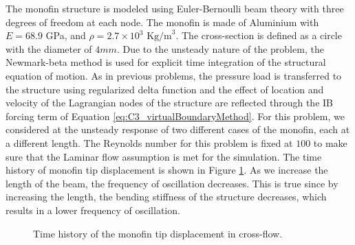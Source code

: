 The monofin structure is modeled using Euler-Bernoulli beam theory with three degrees of freedom at each node. The monofin is made of Aluminium with $E = 68.9$ GPa, and $\rho = 2.7 \times 10^3 \text{ Kg/m}^3$. The cross-section is defined as a circle with the diameter of $4 mm$. Due to the unsteady nature of the problem, the Newmark-beta method is used for explicit time integration of the structural equation of motion. As in previous problems, the pressure load is transferred to the structure using regularized delta function and the effect of location and velocity of the Lagrangian nodes of the structure are reflected through the IB forcing term of Equation \eqref{eq:C3_virtualBoundaryMethod}. For this problem, we considered at the unsteady response of two different cases of the monofin, each at a different length. The Reynolds number for this problem is fixed at $100$ to make sure that the Laminar flow assumption is met for the simulation. The time history of monofin tip displacement is shown in Figure \ref{fig:C5_timeHistoryTipDisplacement}. As we increase the length of the beam, the frequency of oscillation decreases. This is true since by increasing the length, the bending stiffness of the structure decreases, which results in a lower frequency of oscillation.
%
\begin{figure}[H]
    \centering
    \quad
    \caption{Time history of the monofin tip displacement in cross-flow.}
    \label{fig:C5_timeHistoryTipDisplacement}
\end{figure}
